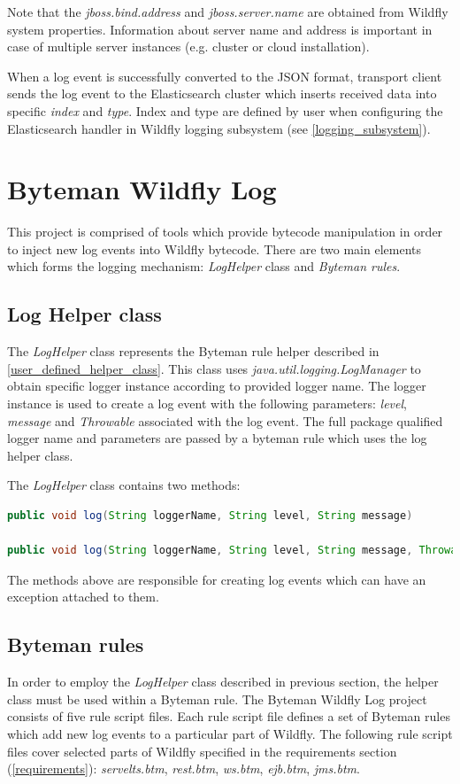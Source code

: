 \documentclass[12pt,oneside]{fithesis2}
\begin{document}
Note that the \textit{jboss.bind.address} and \textit{jboss.server.name} are obtained from Wildfly system properties. Information about server name and address is important in case of multiple server instances (e.g. cluster or cloud installation).

When a log event is successfully converted to the JSON format, transport client sends the log event to the Elasticsearch cluster which inserts received data into specific \textit{index} and \textit{type}. Index and type are defined by user when configuring the Elasticsearch handler in Wildfly logging subsystem (see \ref{logging_subsystem}).

\section{Byteman Wildfly Log}
This project is comprised of tools which provide bytecode manipulation in order to inject new log events into Wildfly bytecode. There are two main elements which forms the logging mechanism: \textit{LogHelper} class and \textit{Byteman rules}.

\subsection{Log Helper class}
The \textit{LogHelper} class represents the Byteman rule helper described in \ref{user_defined_helper_class}. This class uses \textit{java.util.logging.LogManager} to obtain specific logger instance according to provided logger name. The logger instance is used to create a log event with the following parameters: \textit{level}, \textit{message} and \textit{Throwable} associated with the log event. The full package qualified logger name and parameters are passed by a byteman rule which uses the log helper class.

The \textit{LogHelper} class contains two methods:
\begin{lstlisting}[caption = LogHelper methods for creating log events., label = log_helper_methods, language=Java]
public void log(String loggerName, String level, String message)

public void log(String loggerName, String level, String message, Throwable thrown)
\end{lstlisting}
\noindent
The methods above are responsible for creating log events which can have an exception attached to them.

\subsection{Byteman rules}
In order to employ the \textit{LogHelper} class described in previous section, the helper class must be used within a Byteman rule. The Byteman Wildfly Log project consists of five rule script files. Each rule script file defines a set of Byteman rules which add new log events to a particular part of Wildfly. The following rule script files cover selected parts of Wildfly specified in the requirements section (\ref{requirements}): \textit{servelts.btm}, \textit{rest.btm}, \textit{ws.btm}, \textit{ejb.btm}, \textit{jms.btm}.
\end{document}
